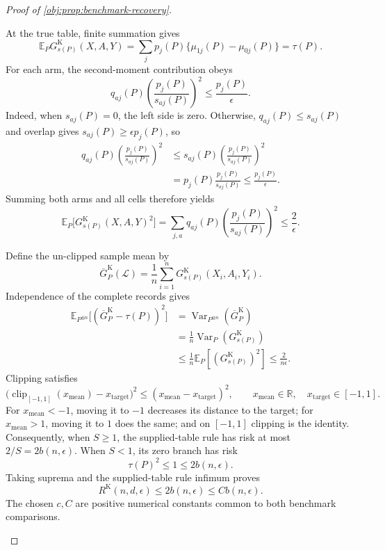\documentclass[11pt]{article}
\begin{document}
\begin{proof}[Proof of \cref{obj:prop:benchmark-recovery}]
\begin{enumerate}
At the true table, finite summation gives
\[
\mathbb E_PG^{\mathrm K}_{s(P)}(X,A,Y)
=\sum_jp_j(P)\{\mu_{1j}(P)-\mu_{0j}(P)\}
=\tau(P).
\]
For each arm, the second-moment contribution obeys
\[
q_{aj}(P)\left(\frac{p_j(P)}{s_{aj}(P)}\right)^2
\le\frac{p_j(P)}{\epsilon}.
\]
Indeed, when \(s_{aj}(P)=0\), the left side is zero. Otherwise,
\(q_{aj}(P)\le s_{aj}(P)\) and overlap gives
\(s_{aj}(P)\ge\epsilon p_j(P)\), so
\[
\begin{aligned}
q_{aj}(P)\left(\frac{p_j(P)}{s_{aj}(P)}\right)^2
&\le s_{aj}(P)\left(\frac{p_j(P)}{s_{aj}(P)}\right)^2\\
&=p_j(P)\frac{p_j(P)}{s_{aj}(P)}
\le\frac{p_j(P)}{\epsilon}.
\end{aligned}
\]
Summing both arms and all cells therefore yields
\[
\mathbb E_P\bigl[G^{\mathrm K}_{s(P)}(X,A,Y)^2\bigr]
=
\sum_{j,a}q_{aj}(P)
\left(\frac{p_j(P)}{s_{aj}(P)}\right)^2
\le\frac2\epsilon.
\]

Define the un-clipped sample mean by
\[
\overline G^{\mathrm K}_P(\mathcal L)
=\frac1n\sum_{i=1}^nG^{\mathrm K}_{s(P)}(X_i,A_i,Y_i).
\]
Independence of the complete records gives
\[
\begin{aligned}
\mathbb E_{P^{\otimes n}}
\bigl[(\overline G^{\mathrm K}_P-\tau(P))^2\bigr]
&=\operatorname{Var}_{P^{\otimes n}}(\overline G^{\mathrm K}_P)\\
&=\frac1n\operatorname{Var}_P(G^{\mathrm K}_{s(P)})\\
&\le\frac1n\mathbb E_P[(G^{\mathrm K}_{s(P)})^2]
\le\frac2{n\epsilon}.
\end{aligned}
\]
Clipping satisfies
\[
\bigl(\operatorname{clip}_{[-1,1]}(x_{\mathrm{mean}})
-x_{\mathrm{target}}\bigr)^2
\le(x_{\mathrm{mean}}-x_{\mathrm{target}})^2,
\qquad
x_{\mathrm{mean}}\in\mathbb R,\quad x_{\mathrm{target}}\in[-1,1].
\]
For \(x_{\mathrm{mean}}<-1\), moving it to \(-1\) decreases its distance to the target; for \(x_{\mathrm{mean}}>1\), moving it to \(1\) does the same; and on \([-1,1]\) clipping is the identity. Consequently, when \(S\ge1\), the supplied-table rule has risk at most \(2/S=2b(n,\epsilon)\). When \(S<1\), its zero branch has risk
\[
\tau(P)^2\le1\le2b(n,\epsilon).
\]
Taking suprema and the supplied-table rule infimum proves
\[
R^{\mathrm K}(n,d,\epsilon)
\le2b(n,\epsilon)\le Cb(n,\epsilon).
\]
The chosen \(c,C\) are positive numerical constants common to both benchmark comparisons.


\end{enumerate}
\end{proof}
\end{document}
